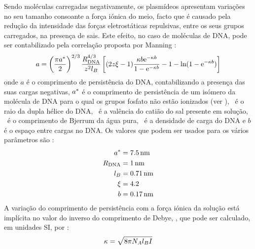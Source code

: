 Sendo moléculas carregadas negativamente, os plasmídeos apresentam variações no seu tamanho consoante a força iónica do meio, facto que é causado pela redução da intensidade das forças eletrostáticas repulsivas, entre os seus grupos carregados, na presença de sais. Este efeito, no caso de moléculas de DNA, pode ser contabilizado pela correlação proposta por Manning \cite{manning}:
\begin{equation}
\label{eq:manning_pra}
a=\left(\frac{\pi a^{*}}{2}\right)^{2/3}\frac{R_{\mathrm{DNA}}^{4/3}}{z^{2}l_{B}}\left[(2z\xi-1)\frac{\kappa b \mathrm{e}^{-\kappa b}}{1-\mathrm{e}^{-\kappa b}}-1-\ln(1-\mathrm{e}^{-\kappa b})\right]
\end{equation}
onde $a$ é o comprimento de persistência do DNA, contabilizando a presença das suas cargas negativas, $a^{*}$ é o comprimento de persistência de um isómero da molécula de DNA para o qual os grupos fosfato não estão ionizados (ver \cite{manning}), \raioduplahelice\ é o raio da dupla hélice do DNA, \cargaeletrica\ é a valência do catião do sal presente em solução, \bjerrum\ é o comprimento de Bjerrum da água pura, \densidadecarga\ é a densidade de carga do DNA e $b$ é o espaço entre cargas no DNA. Os valores que podem ser usados para os vários parâmetros são \cite{latu09,manning}:
\begin{equation}
\label{eq:prop_manning_pra}
\begin{aligned}
  a^{*} & = 7.5\,\mathrm{nm} \\
  R_{\mathrm{DNA}} & = 1\,\mathrm{nm} \\
  l_{B} & = 0.71\,\mathrm{nm} \\
  \xi & = 4.2 \\
  b & = 0.17\,\mathrm{nm}
\end{aligned}  	
\end{equation}
% 
A variação do comprimento de persistência com a força iónica da solução está implícita no valor do inverso do comprimento de Debye, \inversodebye, que pode ser calculado, em unidades SI, por \cite{manning}:
\begin{equation}
\label{eq:inverso_debye_pra}
\kappa = \sqrt{8\pi N_{A}l_{B}I}
\end{equation}%

